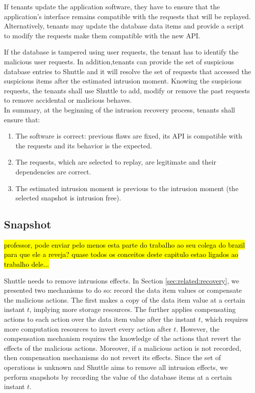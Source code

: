 If tenants update the application software, they have to ensure that the application's interface remains compatible with the requests that will be replayed. Alternatively, tenants may update the database data items and provide a script to modify the requests make them compatible with the new \ac{API}. 

If the database is tampered using user requests, the tenant has to identify the malicious user requests. In addition,tenants can provide the set of suspicious database entries to Shuttle and it will resolve the set of requests that accessed the suspicious items after the estimated intrusion moment. Knowing the suspicious requests, the tenants shall use Shuttle to add, modify or remove the past requests to remove accidental or malicious behaves. \\

In summary, at the beginning of the intrusion recovery process, tenants shall ensure that:
\begin{enumerate}
    \item The software is correct: previous flaws are fixed, its \ac{API} is compatible with the requests and its behavior is the expected.
    \item The requests, which are selected to replay, are legitimate and their dependencies are correct.
    \item The estimated intrusion moment is previous to the intrusion moment (the selected snapshot is intrusion free).
\end{enumerate} 


\subsection{Snapshot}
\label{sec:arch:snapshot}
\hl{professor, pode enviar pelo menos esta parte do trabalho ao seu colega do brazil para que ele a reveja? quase todos os conceitos deste capitulo estao ligados ao trabalho dele...}

Shuttle needs to remove intrusions effects. In Section \ref{sec:related:recovery}, we presented two mechanisms to do so: record the data item values or compensate the malicious actions. The first makes a copy of the data item value at a certain instant $t$, implying more storage resources. The further applies compensating actions to each action over the data item value after the instant $t$, which requires more computation resources to invert every action after $t$. However, the compensation mechanism requires the knowledge of the actions that revert the effects of the malicious actions. Moreover, if a malicious action is not recorded, then compensation mechanisms do not revert its effects. Since the set of operations is unknown and Shuttle aims to remove all intrusion effects, we perform snapshots by recording the value of the database items at a certain instant $t$.\\

